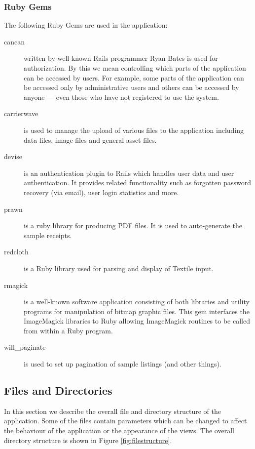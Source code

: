 \documentclass[12pt,twoside]{article}
\begin{document}
\subsubsection{Ruby Gems}
The following Ruby Gems are used in the application:
\begin{description}
\item[cancan\cite{cancan}]
written by well-known Rails programmer Ryan Bates is used for
authorization. By this we mean controlling which parts of the application
can be accessed by users. For example, some parts of the application can
be accessed only by administrative users and others can be accessed by
anyone --- even those who have not registered to use the system.
\item[carrierwave\cite{carrierwave}]
is used to manage the upload of various files to the application
including data files, image files and general asset files.
\item[devise\cite{devise}]
is an authentication plugin to Rails which handles user data and
user authentication. It provides related functionality such as forgotten
password recovery (via email), user login statistics and more.
\item[prawn\cite{prawn}]
is a ruby library for producing PDF files. It is used to
auto-generate the sample receipts.
\item[redcloth\cite{redcloth}]
is a Ruby library used for parsing and display of Textile input.
\item[rmagick\cite{rmagick}]
is a well-known software application consisting of both
libraries and utility programs for manipulation of bitmap graphic files.
This gem interfaces the ImageMagick libraries to Ruby allowing
ImageMagick routines to be called from within a Ruby program.
\item[will\_paginate\cite{willp}]
is used to set up pagination of sample listings (and other things).
\end{description}

\subsection{Files and Directories}
In this section we describe the overall file and directory structure
of the application. Some of the files contain parameters which can be
changed to affect the behaviour of the application or the appearance
of the views. The overall directory structure is shown in
Figure \ref{fig:filestructure}.
\end{document}
